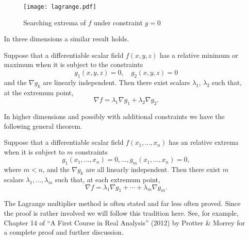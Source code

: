 \begin{figure}[htb]
    \begin{center}
        \texttt{[image: lagrange.pdf]}
        \caption{Searching extrema of \(f\) under constraint \(g=0\)}%
        \label{fig:lagrange}
    \end{center}
\end{figure}

In three dimensions a similar result holds.

\begin{theorem}
    Suppose that a differentiable scalar field \(f(x,y,z)\) has a relative minimum or maximum when it is subject to the constraints
    \[
        g_{1}(x,y,z) = 0,
        \quad
        g_{2}(x,y,z) = 0
    \]
    and the \(\nabla g_k\) are linearly independent.
    Then there exist scalars \(\lambda_1\), \(\lambda_2\) such that, at the extremum point,
    \[
        \nabla f = \lambda_{1} \nabla g_{1} + \lambda_{2} \nabla g_{2}.
    \]
\end{theorem}

In higher dimensions and possibly with additional constraints we have the following general theorem.

\begin{theorem*}
    Suppose that a differentiable scalar field \(f(x_1,\ldots,x_n)\) has an relative extrema when it is subject to \(m\) constraints
    \[
        g_1(x_1,\ldots,x_n) = 0,
        \dots , g_m(x_1,\ldots,x_n)=0,
    \]
    where \(m<n\), and the \(\nabla g_k\) are all linearly independent.
    Then there exist \(m\) scalars \(\lambda_1,\ldots,\lambda_m\) such that, at each extremum point,
    \[
        \nabla f = \lambda_1 \nabla g_1 + \cdots + \lambda_m \nabla g_m.
    \]
\end{theorem*}

The Lagrange multiplier method is often stated and far less often proved.
Since the proof is rather involved we will follow this tradition here.
See, for example, Chapter 14 of  ``A First Course in Real Analysis''  (2012) by Protter \& Morrey for a complete proof and further discussion.

